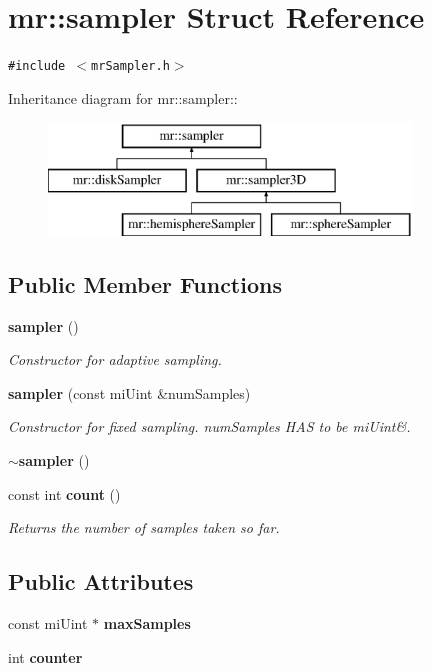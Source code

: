 \section{mr::sampler Struct Reference}
\label{structmr_1_1sampler}
{\tt \#include $<$mr\-Sampler.h$>$}

Inheritance diagram for mr::sampler::\begin{figure}[H]
\begin{center}
\leavevmode
\includegraphics[height=3cm]{structmr_1_1sampler}
\end{center}
\end{figure}
\subsection*{Public Member Functions}
\begin{CompactItemize}
\item 
{\bf sampler} ()
\begin{CompactList}\small\item\em Constructor for adaptive sampling. \item\end{CompactList}\item 
{\bf sampler} (const mi\-Uint \&num\-Samples)
\begin{CompactList}\small\item\em Constructor for fixed sampling. num\-Samples HAS to be mi\-Uint\&. \item\end{CompactList}\item 
{\bf $\sim$sampler} ()
\item 
const int {\bf count} ()
\begin{CompactList}\small\item\em Returns the number of samples taken so far. \item\end{CompactList}\end{CompactItemize}
\subsection*{Public Attributes}
\begin{CompactItemize}
\item 
const mi\-Uint $\ast$ {\bf max\-Samples}
\item 
int {\bf counter}
\end{CompactItemize}



